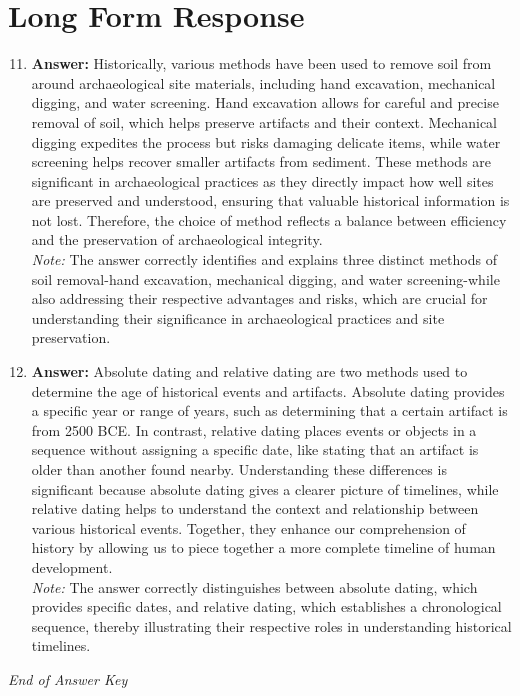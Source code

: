 \documentclass[12pt]{article}
\begin{document}
\section*{Long Form Response}
\begin{enumerate}[label=\arabic*.]
\setcounter{enumi}{10}
\item \textbf{Answer:} Historically, various methods have been used to remove soil from around archaeological site materials, including hand excavation, mechanical digging, and water screening. Hand excavation allows for careful and precise removal of soil, which helps preserve artifacts and their context. Mechanical digging expedites the process but risks damaging delicate items, while water screening helps recover smaller artifacts from sediment. These methods are significant in archaeological practices as they directly impact how well sites are preserved and understood, ensuring that valuable historical information is not lost. Therefore, the choice of method reflects a balance between efficiency and the preservation of archaeological integrity.
\\ \textit{Note:} The answer correctly identifies and explains three distinct methods of soil removal-hand excavation, mechanical digging, and water screening-while also addressing their respective advantages and risks, which are crucial for understanding their significance in archaeological practices and site preservation.
\item \textbf{Answer:} Absolute dating and relative dating are two methods used to determine the age of historical events and artifacts. Absolute dating provides a specific year or range of years, such as determining that a certain artifact is from 2500 BCE. In contrast, relative dating places events or objects in a sequence without assigning a specific date, like stating that an artifact is older than another found nearby. Understanding these differences is significant because absolute dating gives a clearer picture of timelines, while relative dating helps to understand the context and relationship between various historical events. Together, they enhance our comprehension of history by allowing us to piece together a more complete timeline of human development.
\\ \textit{Note:} The answer correctly distinguishes between absolute dating, which provides specific dates, and relative dating, which establishes a chronological sequence, thereby illustrating their respective roles in understanding historical timelines.
\end{enumerate}

\vfill
\noindent\textit{End of Answer Key}
\end{document}
